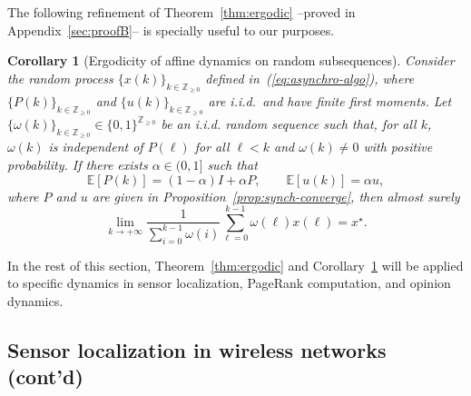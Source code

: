 \documentclass{IEEEtran}
\newtheorem{corollary}{Corollary}
\newcommand{\integernonnegative}{\mathbb{Z}_{\ge 0}}
\def\Exp{\mathbb{E}}
\newcommand{\1}{\mathbf{1}} \newcommand{\ind}{\mathds{1}}
\begin{document}
The following refinement of Theorem~\ref{thm:ergodic} --proved in Appendix~\ref{sec:proofB}-- is specially useful to our purposes.
\begin{corollary}[Ergodicity of affine dynamics on random subsequences]
\label{cor:ergodic2}
Consider the random process $\{x(k)\}_{k\in\integernonnegative}$ defined in~(\ref{eq:asynchro-algo}), where $\{P(k)\}_{k\in\integernonnegative}$ and $\{u(k)\}_{k\in\integernonnegative}$ are i.i.d.\ and have finite first moments. 
Let $\{\omega(k)\}_{k\in\integernonnegative}\in\{0,1\}^{\integernonnegative}$ be an i.i.d. random sequence such that, for all $k$, $\omega(k)$ is independent of $P(\ell)$ for all $\ell<k$ and  $\omega(k)\neq 0$ with positive probability.
If there exists $\alpha\in(0,1]$ such that 
\begin{equation}\label{eq:hyp}\Exp[P(k)]=(1-\alpha)I+\alpha P,\qquad\Exp[u(k)]=\alpha u,\end{equation} where $P$ and $u$ are given in Proposition~\ref{prop:synch-converge}, then almost surely
$$
\lim_{k\rightarrow+\infty}\frac{1}{\sum_{i=0}^{k-1}\omega(i)}\sum_{\ell=0}^{k-1}\omega(\ell)x(\ell)=x^{\star}.
$$
\end{corollary}

In the rest of this section, Theorem~\ref{thm:ergodic} and Corollary~\ref{cor:ergodic2} will be applied to specific dynamics in sensor localization, PageRank computation, and opinion dynamics. 


\subsection{Sensor localization in wireless networks (cont'd)}\label{sect:random-localization}
\end{document}
